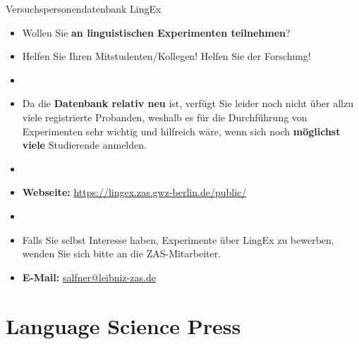 \begin{frame}{Versuchspersonendatenbank LingEx}

\begin{itemize}
	\item Wollen Sie \textbf{an linguistischen Experimenten teilnehmen}?
	\item Helfen Sie Ihren Mitstudenten/Kollegen! Helfen Sie der Forschung!
	
	\item[]
	
	\item Da die \textbf{Datenbank relativ neu} ist, verfügt Sie leider noch nicht über allzu viele registrierte Probanden, weshalb es für die Durchführung von Experimenten sehr wichtig und hilfreich wäre, wenn sich noch \textbf{möglichst viele} Studierende anmelden.
	
	\item[] 

	\item \textbf{Webseite:}  \url{https://lingex.zas.gwz-berlin.de/public/}	
	
	\item[]
	\item Falls Sie selbst Interesse haben, Experimente über LingEx zu bewerben, wenden Sie sich bitte an die ZAS-Mitarbeiter.
	
	\item \textbf{E-Mail:} \href{mailto:salfner@leibniz-zas.de}{salfner@leibniz-zas.de}
		
\end{itemize}		

\end{frame}


\section{Language Science Press}

